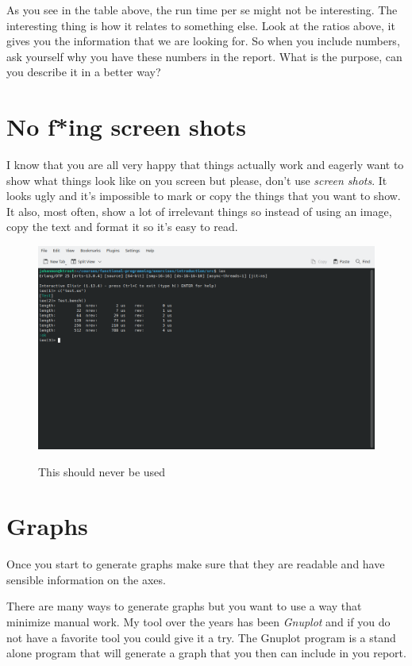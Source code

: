 \documentclass[a4paper,11pt]{article}
\begin{document}
As you see in the table above, the run time per se might not be
interesting. The interesting thing is how it relates to something
else. Look at the ratios above, it gives you the information that we
are looking for. So when you include numbers, ask yourself why you
have these numbers in the report. What is the purpose, can you
describe it in a better way?

\section*{No f*ing screen shots}

I know that you are all very happy that things actually work and
eagerly want to show what things look like on you screen but please,
don't use {\em screen shots}. It looks ugly and it's impossible to mark or
copy the things that you want to show. It also, most often, show a lot
of irrelevant things so instead of using an image, copy the text and
format it so it's easy to read.

\begin{figure}
  \centering
  \includegraphics[scale=0.45]{screenshot.png}
  \label{fig:screenshot}
  \caption{This should never be used}
\end{figure}

\section*{Graphs}

Once you start to generate graphs make sure that they are readable and
have sensible information on the axes.

There are many ways to generate graphs but you want to use a way that
minimize manual work. My tool over the years has been {\em Gnuplot}
and if you do not have a favorite tool you could give it a try. The
Gnuplot program is a stand alone program that will generate a
graph that you then can include in you report.
\end{document}
